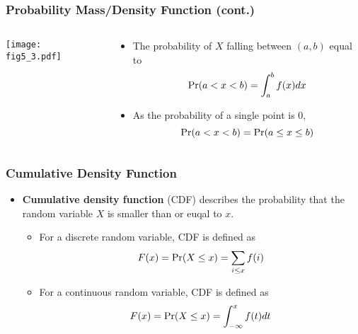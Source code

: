 \documentclass[pdflatex, 12pt]{beamer}
\begin{document}
\begin{frame}
\frametitle{Probability Mass/Density Function (cont.)}
\begin{columns}
\begin{column}{0.5\textwidth}
\texttt{[image: fig5\_3.pdf]}
\end{column}
\begin{column}{0.5\textwidth}
\begin{itemize}
\item The probability of $X$ falling between $(a, b)$ equal to
 \begin{equation}
 \Pr(a < x < b) = \int^b_a f(x) dx \notag
 \end{equation}
\vspace{0.2cm}
\item As the probability of a single point is 0, 
 {\small
 \begin{equation}
 \Pr(a < x < b) = \Pr(a \leq x \leq b) \notag 
 \end{equation}
 }
\end{itemize}
\end{column}
\end{columns}
\end{frame}

\begin{frame}
\frametitle{Cumulative Density Function}
\begin{itemize}
\item \textbf{Cumulative density function} (CDF) describes the probability that the random variable $X$ is smaller than or euqal to $x$.
 \begin{itemize}
 \item For a discrete random variable, CDF is defined as 
  \begin{equation}
  F(x) = \Pr(X \leq x) = \sum_{i \leq x} f(i) \notag
  \end{equation}
 \item For a continuous random variable, CDF is defined as 
  \begin{equation}
  F(x) = \Pr(X \leq x) = \int^x_{-\infty} f(t) dt \notag
  \end{equation}
 \end{itemize}
\end{itemize}
\end{frame}
\end{document}
